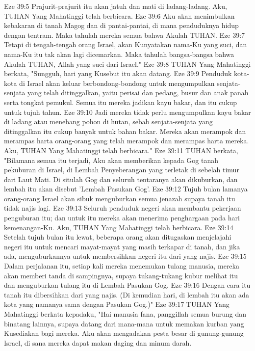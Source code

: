 Eze 39:5  Prajurit-prajurit itu akan jatuh dan mati di ladang-ladang. Aku, TUHAN Yang Mahatinggi telah berbicara.
Eze 39:6  Aku akan menimbulkan kebakaran di tanah Magog dan di pantai-pantai, di mana penduduknya hidup dengan tentram. Maka tahulah mereka semua bahwa Akulah TUHAN.
Eze 39:7  Tetapi di tengah-tengah orang Israel, akan Kunyatakan nama-Ku yang suci, dan nama-Ku itu tak akan lagi dicemarkan. Maka tahulah bangsa-bangsa bahwa Akulah TUHAN, Allah yang suci dari Israel."
Eze 39:8  TUHAN Yang Mahatinggi berkata, "Sungguh, hari yang Kusebut itu akan datang.
Eze 39:9  Penduduk kota-kota di Israel akan keluar berbondong-bondong untuk mengumpulkan senjata-senjata yang telah ditinggalkan, yaitu perisai dan pedang, busur dan anak panah serta tongkat pemukul. Semua itu mereka jadikan kayu bakar, dan itu cukup untuk tujuh tahun.
Eze 39:10  Jadi mereka tidak perlu mengumpulkan kayu bakar di ladang atau menebang pohon di hutan, sebab senjata-senjata yang ditinggalkan itu cukup banyak untuk bahan bakar. Mereka akan merampok dan merampas harta orang-orang yang telah merampok dan merampas harta mereka. Aku, TUHAN Yang Mahatinggi telah berbicara."
Eze 39:11  TUHAN berkata, "Bilamana semua itu terjadi, Aku akan memberikan kepada Gog tanah pekuburan di Israel, di Lembah Penyeberangan yang terletak di sebelah timur dari Laut Mati. Di situlah Gog dan seluruh tentaranya akan dikuburkan, dan lembah itu akan disebut 'Lembah Pasukan Gog'.
Eze 39:12  Tujuh bulan lamanya orang-orang Israel akan sibuk menguburkan semua jenazah supaya tanah itu tidak najis lagi.
Eze 39:13  Seluruh penduduk negeri akan membantu pekerjaan penguburan itu; dan untuk itu mereka akan menerima penghargaan pada hari kemenangan-Ku. Aku, TUHAN Yang Mahatinggi telah berbicara.
Eze 39:14  Setelah tujuh bulan itu lewat, beberapa orang akan ditugaskan menjelajahi negeri itu untuk mencari mayat-mayat yang masih terkapar di tanah, dan jika ada, menguburkannya untuk membersihkan negeri itu dari yang najis.
Eze 39:15  Dalam perjalanan itu, setiap kali mereka menemukan tulang manusia, mereka akan memberi tanda di sampingnya, supaya tukang-tukang kubur melihat itu dan menguburkan tulang itu di Lembah Pasukan Gog.
Eze 39:16  Dengan cara itu tanah itu dibersihkan dari yang najis. (Di kemudian hari, di lembah itu akan ada kota yang namanya sama dengan Pasukan Gog.)"
Eze 39:17  TUHAN Yang Mahatinggi berkata kepadaku, "Hai manusia fana, panggillah semua burung dan binatang lainnya, supaya datang dari mana-mana untuk memakan kurban yang Kusediakan bagi mereka. Aku akan mengadakan pesta besar di gunung-gunung Israel, di sana mereka dapat makan daging dan minum darah.
